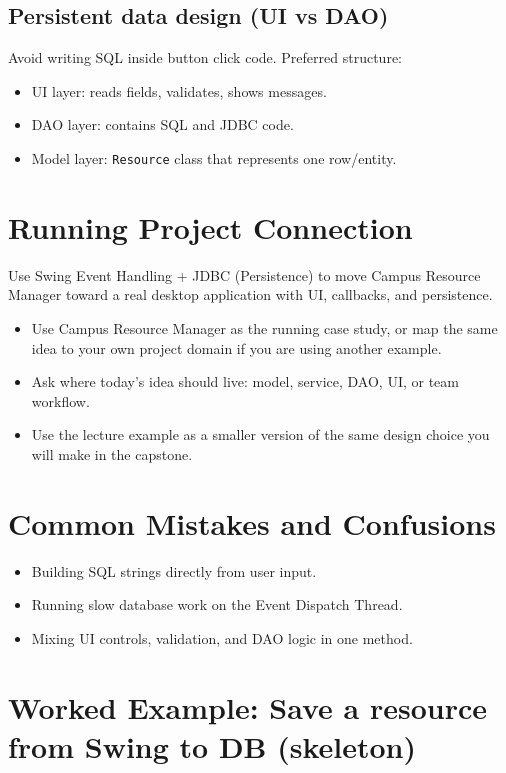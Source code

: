 \documentclass[11pt]{article}
\begin{document}
\subsection{Persistent data design (UI vs DAO)}
Avoid writing SQL inside button click code.
Preferred structure:
\begin{itemize}
  \item UI layer: reads fields, validates, shows messages.
  \item DAO layer: contains SQL and JDBC code.
  \item Model layer: \texttt{Resource} class that represents one row/entity.
\end{itemize}
\notesources{\OOPSUnitIVSources}

\section{Running Project Connection}
Use Swing Event Handling + JDBC (Persistence) to move Campus Resource Manager toward a real desktop application with UI, callbacks, and persistence.
\begin{itemize}
  \item Use Campus Resource Manager as the running case study, or map the same idea to your own project domain if you are using another example.
  \item Ask where today's idea should live: model, service, DAO, UI, or team workflow.
  \item Use the lecture example as a smaller version of the same design choice you will make in the capstone.
\end{itemize}
\notesources{\OOPSUnitIVSources}

\section{Common Mistakes and Confusions}
\begin{itemize}
  \item Building SQL strings directly from user input.
  \item Running slow database work on the Event Dispatch Thread.
  \item Mixing UI controls, validation, and DAO logic in one method.
\end{itemize}
\notesources{\OOPSUnitIVSources}

\section{Worked Example: Save a resource from Swing to DB (skeleton)}
\end{document}
